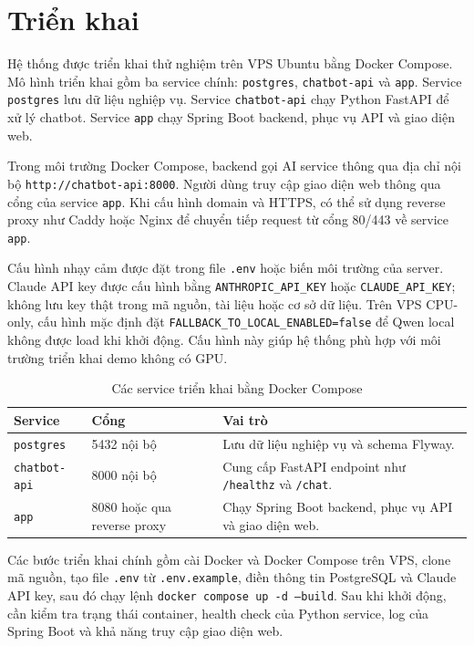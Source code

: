 \documentclass[../DoAn.tex]{subfiles}
\begin{document}
\section{Triển khai}

Hệ thống được triển khai thử nghiệm trên VPS Ubuntu bằng Docker Compose. Mô hình triển khai gồm ba service chính: \texttt{postgres}, \texttt{chatbot-api} và \texttt{app}. Service \texttt{postgres} lưu dữ liệu nghiệp vụ. Service \texttt{chatbot-api} chạy Python FastAPI để xử lý chatbot. Service \texttt{app} chạy Spring Boot backend, phục vụ API và giao diện web.

Trong môi trường Docker Compose, backend gọi AI service thông qua địa chỉ nội bộ \texttt{http://chatbot-api:8000}. Người dùng truy cập giao diện web thông qua cổng của service \texttt{app}. Khi cấu hình domain và HTTPS, có thể sử dụng reverse proxy như Caddy hoặc Nginx để chuyển tiếp request từ cổng 80/443 về service \texttt{app}.

Cấu hình nhạy cảm được đặt trong file \texttt{.env} hoặc biến môi trường của server. Claude API key được cấu hình bằng \texttt{ANTHROPIC\_API\_KEY} hoặc \texttt{CLAUDE\_API\_KEY}; không lưu key thật trong mã nguồn, tài liệu hoặc cơ sở dữ liệu. Trên VPS CPU-only, cấu hình mặc định đặt \texttt{FALLBACK\_TO\_LOCAL\_ENABLED=false} để Qwen local không được load khi khởi động. Cấu hình này giúp hệ thống phù hợp với môi trường triển khai demo không có GPU.

\begin{table}[H]
\centering
\caption{Các service triển khai bằng Docker Compose}
\label{tab:ch4-deploy-services}
\begin{tabular}{|p{}|p{}|p{}|}
\hline
\textbf{Service} & \textbf{Cổng} & \textbf{Vai trò} \\
\hline
\texttt{postgres} & 5432 nội bộ & Lưu dữ liệu nghiệp vụ và schema Flyway. \\
\hline
\texttt{chatbot-api} & 8000 nội bộ & Cung cấp FastAPI endpoint như \texttt{/healthz} và \texttt{/chat}. \\
\hline
\texttt{app} & 8080 hoặc qua reverse proxy & Chạy Spring Boot backend, phục vụ API và giao diện web. \\
\hline
\end{tabular}
\end{table}

Các bước triển khai chính gồm cài Docker và Docker Compose trên VPS, clone mã nguồn, tạo file \texttt{.env} từ \texttt{.env.example}, điền thông tin PostgreSQL và Claude API key, sau đó chạy lệnh \texttt{docker compose up -d --build}. Sau khi khởi động, cần kiểm tra trạng thái container, health check của Python service, log của Spring Boot và khả năng truy cập giao diện web.
\end{document}
